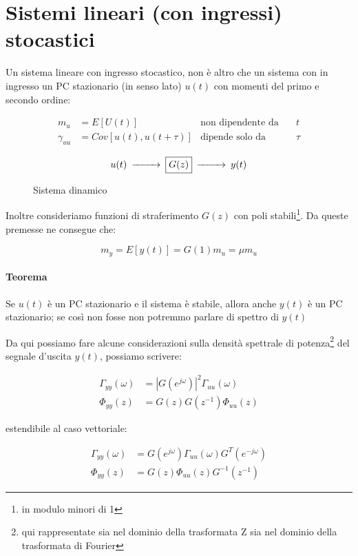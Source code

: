 \section{Sistemi lineari (con ingressi) stocastici}
Un sistema lineare con ingresso stocastico, non è altro che un sistema con in ingresso un PC stazionario (in senso lato) $u(t)$ con momenti del primo e secondo ordine:

  \begin{align*}
    m_u&=E[U(t)] &\text{non dipendente da}\quad &t\\
    \gamma_{uu}&=Cov[u(t),u(t+\tau)] &\text{dipende solo da}\quad &\tau
  \end{align*} 
  
\begin{figure}[htbp]\Large
  \centering
  \[
    \begin{CD}
      u(t) @>>> \framebox{$G(z)$} @>>> y(t)
    \end{CD}
  \]
  \caption{Sistema dinamico \label{fig:sistlinstoc}}
\end{figure}

\noindent Inoltre consideriamo funzioni di straferimento $G(z)$ con poli stabili\footnote{in modulo minori di 1}. Da queste premesse ne consegue che:

  \[ m_y=E[y(t)]=G(1)m_u=\mu m_u \]

\paragraph{Teorema} Se $u(t)$ è un PC stazionario e il sistema è stabile, allora anche $y(t)$ è un PC stazionario; se così non fosse non potremmo parlare di spettro di $y(t)$

Da qui possiamo fare alcune considerazioni sulla densità spettrale di potenza\footnote{qui rappresentate sia nel dominio della trasformata Z sia nel dominio della trasformata di Fourier} del segnale d'uscita $y(t)$, possiamo scrivere:

  \begin{align*}
    \Gamma_{yy}(\omega)&=|G(e^{j\omega})|^2\Gamma_{uu}(\omega)\\
    \Phi_{yy}(z)&=G(z)G(z^{-1})\Phi_{uu}(z)
  \end{align*}
  
\noindent estendibile al caso vettoriale:

  \begin{align*}
    \Gamma_{yy}(\omega)&=G(e^{j\omega})\Gamma_{uu}(\omega)G^T(e^{-j\omega})\\
    \Phi_{yy}(z)&=G(z)\Phi_{uu}(z)G^{-1}(z^{-1})
  \end{align*}

